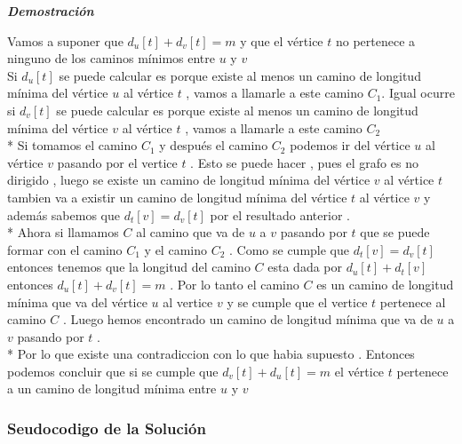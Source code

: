 \documentclass[10pt]{article}
\begin{document}
    \noindent \textit{\textbf{Demostraci\'on}}

    \noindent Vamos a suponer que $d_u\left[t\right] + d_v\left[t\right] = m $ y que el v\'ertice $t$ no pertenece a ninguno de los caminos m\'inimos entre $u$ y $v$ 
    \\[5pt] 
    Si $d_u\left[t\right]$ se puede calcular es porque existe  al menos un camino de longitud m\'inima del v\'ertice $u$ al v\'ertice  $t$  , vamos a llamarle a este camino $C_1$.
    Igual ocurre si  $d_v\left[t\right]$ se puede calcular es porque existe  al menos un camino de longitud m\'inima del v\'ertice $v$ al v\'ertice  $t$  , vamos a llamarle a este camino $C_2$
    \\*
    Si tomamos el camino $C_1$ y despu\'es el camino $C_2$ podemos ir del v\'ertice $u$ al v\'ertice $v$ pasando por el vertice $t$ . Esto se puede hacer , pues el grafo es no dirigido , luego se existe un camino de longitud m\'inima del v\'ertice $v$ al v\'ertice $t$ tambien va 
    a existir un camino de longitud m\'inima del v\'ertice $t$ al v\'ertice $v$ y adem\'as sabemos que $d_t\left[v\right] = d_v\left[t\right]$ por el resultado anterior .
    \\*
    Ahora si llamamos $C$ al camino que va de $u$ a $v$ pasando por $t$ que se puede formar con el camino $C_1$ y el camino $C_2$  . Como se cumple que $d_t\left[v\right] = d_v\left[t\right]$  entonces tenemos que la longitud del camino $C$ esta dada por $d_u\left[t\right] + d_t\left[v\right]$ entonces 
    $d_u\left[t\right] + d_v\left[t\right] = m $ . Por lo tanto el camino $C$ es un camino de longitud m\'inima que va del v\'ertice $u$ al vertice $v$ y se cumple que el vertice $t$ pertenece al camino $C$ . Luego hemos encontrado un camino de longitud m\'inima que va de $u$ a $v$ pasando por $t$ .
    \\*
    Por lo que existe una contradiccion con lo que habia supuesto . Entonces podemos concluir que si se cumple que $d_v\left[t\right] + d_u\left[t\right] = m $    el v\'ertice $t$ pertenece a un camino de longitud m\'inima  entre $u$ y $v$  
    
    \subsubsection{Seudocodigo de la Soluci\'on }
    
\end{document}
